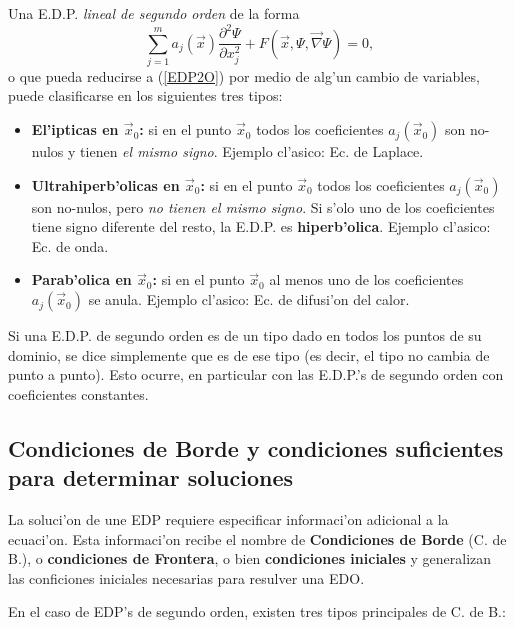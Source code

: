 Una E.D.P. \textit{lineal de segundo orden} de la forma \cite{Hassani}
\begin{equation}\label{EDP2O}
\sum_{j=1}^m a_j(\vec{x})\frac{\partial^2\Psi}{\partial x_j^2}+F\left(\vec{x},\Psi,\vec\nabla\Psi\right)=0,
\end{equation}
o que pueda reducirse a (\ref{EDP2O}) por medio de alg'un cambio de variables, puede clasificarse en los siguientes tres tipos:
\begin{itemize}
\item \textbf{El'ipticas en $\vec{x}_0$:} si en el punto $\vec{x}_0$ todos los coeficientes $a_j(\vec{x}_0)$ son no-nulos y tienen \textit{el mismo signo}. Ejemplo cl'asico: Ec. de Laplace.
\item \textbf{Ultrahiperb'olicas en $\vec{x}_0$:} si en el punto $\vec{x}_0$ todos los coeficientes $a_j(\vec{x}_0)$ son no-nulos, pero \textit{no tienen el mismo signo}. Si s'olo uno de los coeficientes tiene signo diferente del resto, la E.D.P. es \textbf{hiperb'olica}. Ejemplo cl'asico: Ec. de onda.
\item \textbf{Parab'olica en $\vec{x}_0$:} si en el punto $\vec{x}_0$ al menos uno de los coeficientes $a_j(\vec{x}_0)$ se anula. Ejemplo cl'asico: Ec. de difusi'on del calor.
\end{itemize}
Si una E.D.P. de segundo orden es de un tipo dado en todos los puntos de su dominio, se dice simplemente que es de ese tipo (es decir, el tipo no cambia de punto a punto). Esto ocurre, en particular con las E.D.P.'s de segundo orden con coeficientes constantes.

\subsection{Condiciones de Borde y condiciones suficientes para determinar soluciones}
La soluci'on de une EDP requiere especificar informaci'on adicional a la ecuaci'on. Esta informaci'on recibe el nombre de \textbf{Condiciones de Borde} (C. de B.), o \textbf{condiciones de Frontera}, o bien \textbf{condiciones iniciales} y generalizan las conficiones iniciales necesarias para resulver una EDO.

En el caso de EDP's de segundo orden, existen tres tipos principales de C. de B.:

